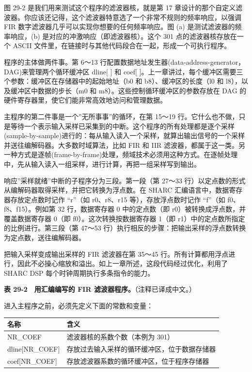 图 29-2 是我们用来测试这个程序的滤波器核，就是第 17
章设计的那个自定义滤波器。你应该还记得，这个滤波器特意选了一个非常不规则的频率响应，以强调
FIR 数字滤波器几乎可以实现你想要的任何频率响应。图 (a)
是测试滤波器的频率响应，(b) 是对应的冲激响应（即滤波器核）。这个 301
点的滤波器核存放在一个 ASCII
文件里，在链接时与其他代码段合在一起，形成一个可执行程序。

程序的主体做两件事。第 6～13
行配置数据地址发生器(data-address-generator，DAG)来管理两个循环缓冲区
dline{[} {]} 和 coef{[}
{]}。上一章讲过，每个缓冲区需要三个参数：缓冲区在存储器中的起始地址（b0
和 b8）、缓冲区的长度（l0 和 l8），以及缓冲区中数据的步长（m0 和
m8）。这些控制循环缓冲区的参数存放在 DAG
的硬件寄存器里，使它们能非常高效地访问和管理数据。

主程序的第二件事是一个''无所事事''的循环，在第 15～19
行。它什么也不做，只是等待一个表示输入采样已采集到的中断。这个程序的所有处理都是逐个采样(sample-by-sample)进行的：每从输入读入一个采样，就算出输出信号的一个采样并送往编解码器。大多数时域算法，比如
FIR 和 IIR
滤波器，都属于这一类。另一种方式是逐帧(frame-by-frame)处理，频域技术必须用这种方式。在逐帧处理中，先从输入读入一组采样，进行计算，再把一组采样写到输出。

响应''采样就绪''中断的子程序分为三段。第一段（第 27～33
行）以定点数的形式从编解码器取得采样，并把它转换为浮点数。在 SHARC
汇编语言中，数据寄存器存放定点数时记作 ``r''（如 r0、r8、r15
等），存放浮点数时记作 ``f''（如 f0、f8、f15）。例如第 32 行，数据寄存器
0 中的定点数（即 r0）被转换成浮点数，并覆盖数据寄存器 0（即
f0）。这次转换按数据寄存器 1（即
r1）中的定点数所指定的比例进行。第三段（第 47～53
行）执行相反的步骤：把输出采样的浮点数转换为定点数，送往编解码器。

把输入采样变成输出采样的 FIR 滤波器在第 35～45
行。所有计算都用浮点进行，因此不必操心缩放和溢出。如上一章所述，这段代码经过优化，利用了
SHARC DSP 每个时钟周期执行多条指令的能力。

\textbf{表 29-2　用汇编编写的 FIR 滤波器程序。}（注释已译成中文。）

进入主程序之前，必须先定义下面的常数和变量：

{\def\LTcaptype{none} %
\begin{longtable}[]{@{}ll@{}}
\toprule\noalign{}
名称 & 含义 \\
\midrule\noalign{}
\endhead
\bottomrule\noalign{}
\endlastfoot
NR\_COEF & 滤波器核的系数个数（本例为 301） \\
dline{[}NR\_COEF{]} & 存放过去输入采样的循环缓冲区，位于数据存储器 \\
coef{[}NR\_COEF{]} & 存放滤波器系数的循环缓冲区，位于程序存储器 \\
\end{longtable}
}

